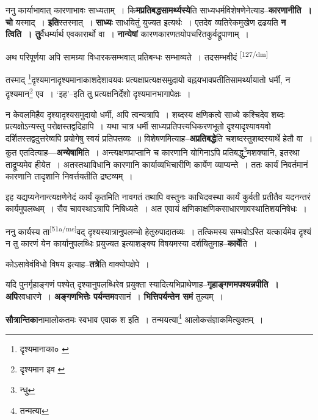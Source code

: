 \documentclass[article,12pt,a4paper]{memoir}
\begin{document}
	  \pstart ननु कार्याभावात् कारणाभावः साध्यताम् । कि\textbf{मप्रतिबद्धसामर्थ्यस्ये}ति साध्यधर्मविशेषणेनेत्याह--\textbf{कारणानीति । चो} यस्माद् । \textbf{इति}स्तस्मात् । \textbf{साध्यः} साधयितुं युज्यत इत्यर्थः । एतदेव व्यतिरेकमुखेण द्रढयति \textbf{न त्विति । तु}र्वैधर्म्यार्थ एवकारार्थो वा । \textbf{नान्येषां} कारणकारणतयोपचरितकुर्वद्रूपाणाम् ।
	\pend
      

	  \pstart अथ परिपूर्णया अपि सामग्र्या विधारकसम्भवात् प्रतिबन्धः सम्भाव्यते । तदसम्भवीदं  \leavevmode\textsuperscript{\rmlatinfont\tiny [127/dm]} 
	  
	तस्माद् \footnote{दृश्यमानाका० \cite{dp-msC} \cite{dp-msA}}दृश्यमानादृश्यमानाकाशदेशावयवः प्रत्यक्षाप्रत्यक्षसमुदायो वह्नयभावप्रतीतिसामर्थ्यायातो धर्मी, न दृश्यमान\footnote{दृश्यमान इव \cite{dp-msC}} एव । ‘इह’--इति तु प्रत्यक्षनिर्देशो दृश्यमानभागापेक्षः । 
	  
	न केवलमिहैव दृश्यादृश्यसमुदायो धर्मी, अपि त्वन्यत्रापि । शब्दस्य क्षणिकत्वे साध्ये कश्चिदेव शब्दः प्रत्यक्षोऽन्यस्तु परोक्षस्तद्वदिहापि । यथा चात्र धर्मी साध्यप्रतिपत्त्यधिकरणभूतो दृश्यादृश्यावयवो दर्शितस्तद्वदुत्तरेष्वपि प्रयोगेषु स्वयं प्रतिपत्तव्यः ॥ विशेषणमित्याह--\textbf{अप्रतिबद्धे}ति चशब्दस्तुशब्दस्यार्थे हेतौ वा । कुत एतदित्याह—\textbf{अन्येषामि}ति । अन्त्यक्षणप्राप्तानि च कारणानि योगिनाऽपि प्रतिबद्धु\footnote{न्धु}मशक्यानि, इतरथा ताद्रूप्यमेव हीयेत । अतस्तथाविधानि कारणानि कार्याव्यभिचारीणि कार्येण व्याप्यन्ते । ततः कार्यं निवर्तमानं कारणानि तादृशानि निवर्त्तयतीति द्रष्टव्यम् ।
	\pend
      

	  \pstart इह यद्यप्यनेनान्त्यक्षणेनेदं कार्यं कृतमिति नावगतं तथापि वस्तुनः काचिदवस्था कार्यं कुर्वती प्रतीतैव यदनन्तरं कार्यमुपलब्धम् । सैव चावस्थाऽत्रापि निषिध्यते । अत एवायं क्षणिकाक्षणिकसाधारणावस्थातिशयनिषेधः ।
	\pend
      

	  \pstart ननु कार्यस्य ता\leavevmode\textsuperscript{\rmlatinfont\tiny [51a/ms]}वद् दृश्यस्यात्रानुपलम्भो हेतुरुपादातव्यः । तत्किमस्य सम्भवोऽस्ति यत्कार्यमेव दृश्यं न तु कारणं येन कार्यानुपलब्धिः प्रयुज्यत इत्याशङ्क्य विषयमस्या दर्शयितुमाह--\textbf{कार्ये}ति ।
	\pend
      

	  \pstart कोऽसावेवंविधो विषय इत्याह--\textbf{तत्रे}ति वाक्योपक्षेपे ।
	\pend
      

	  \pstart यदि पुनर्गृहाङ्गणं पश्येत् दृश्यानुपलब्धिरेव प्रयुक्ता स्यादित्यभिप्राथेणाह--\textbf{गृहाङ्गणमपश्यन्नपीति । अपि}रवधारणे । \textbf{अङ्गणभित्तेः पर्यन्तम}वसानं । \textbf{भित्तिपर्यन्तेन समं} तुल्यम् ।
	\pend
      

	  \pstart \textbf{सौत्रान्तिका}नामालोकतमः स्वभाव एवाक श इति । तन्मयत्या\footnote{तन्मत्या} आलोकसंज्ञाकमित्युक्तम् ।
	\pend
      
\end{document}
